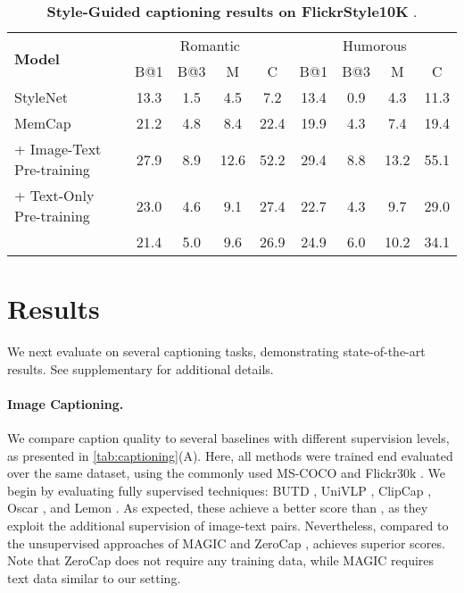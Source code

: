 
\begin{table*}
{ \small
\begin{tabular}{lcccccccc}
    \toprule
    \multirow{2}{50pt}{\textbf{Model}} &
    \multicolumn{4}{c}{Romantic} & 
    \multicolumn{4}{c}{Humorous} \\
    \cmidrule(lr){2-5} \cmidrule(lr){6-9} &
    B@1 & B@3 & M & C & B@1 & B@3 & M & C \\
\midrule
    StyleNet & 13.3 & 1.5 & 4.5 & 7.2 & 13.4 & 0.9 & 4.3 & 11.3 \\
    \midrule
    MemCap & 21.2 & 4.8 & 8.4 & 22.4 & 19.9 & 4.3 & 7.4 & 19.4 \\
    \midrule
\modelname{} + Image-Text Pre-training & 27.9 & 8.9 & 12.6 & 52.2 & 29.4 & 8.8 & 13.2 & 55.1 \\
    \midrule
    \modelname{} + Text-Only Pre-training & 23.0 & 4.6 & 9.1 & 27.4 & 22.7 & 4.3 & 9.7 & 29.0 \\
    \midrule
    \modelname{}  & 21.4 & 5.0 & 9.6 & 26.9 & 24.9 & 6.0 & 10.2 & 34.1 \\
    \toprule
\end{tabular}
\caption{\textbf{Style-Guided captioning results on FlickrStyle10K }\cite{gan2017stylenet}. 
}
\vspace{-0.35cm}
\label{tab:style} 
}
\end{table*} \section{Results}
\label{sec:res} 

We next evaluate \modelname{} on several captioning tasks, demonstrating state-of-the-art results. See supplementary for additional details.









\paragraph{Image Captioning.}
We compare \modelname{} caption quality to several baselines with different supervision levels, as presented in \cref{tab:captioning}(A). Here, all methods were trained end evaluated over the same dataset, using the commonly used MS-COCO \cite{lin2014microsoft, chen2015microsoft} and Flickr30k \cite{young2014image}. We begin by evaluating fully supervised techniques: BUTD \cite{anderson2018bottom}, UniVLP \cite{zhou2020unified}, ClipCap \cite{mokady2021clipcap}, Oscar \cite{li2020oscar}, and Lemon \cite{hu2022scaling}. As expected, these achieve a better score than \modelname{}, as they exploit the additional supervision of image-text pairs. Nevertheless, compared to the unsupervised approaches of MAGIC \cite{su2022language} and ZeroCap \cite{tewel2022zerocap}, \modelname{} achieves superior scores. Note that ZeroCap does not require any training data, while MAGIC requires text data similar to our setting. 


